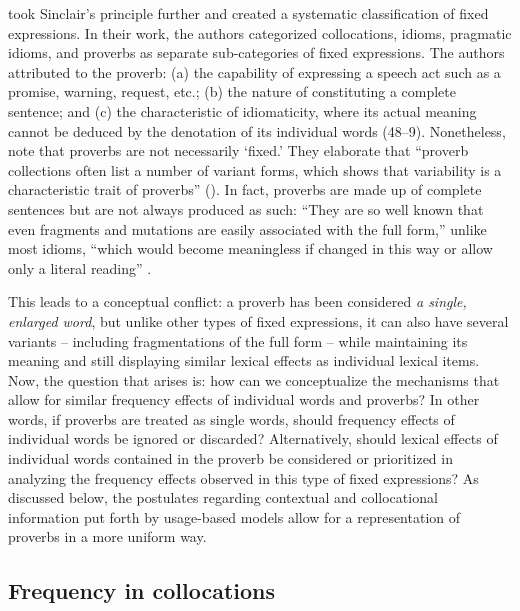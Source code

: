 \documentclass[output=paper,colorlinks,citecolor=brown,draftmode]{langscibook}
\begin{document}
\citet{gramley1992survey} took Sinclair's principle further and created a systematic classification of fixed expressions. In their work, the authors categorized collocations, idioms, pragmatic idioms, and proverbs as separate sub-categories of fixed expressions. The authors attributed to the proverb: (a) the capability of expressing a speech act such as a promise, warning, request, etc.; (b) the nature of constituting a complete sentence; and (c) the characteristic of idiomaticity, where its actual meaning cannot be deduced by the denotation of its individual words (48--9). Nonetheless, \citet{gramley1992survey} note that proverbs are not necessarily `fixed.' They elaborate that ``proverb collections often list a number of variant forms, which shows that variability is a characteristic trait of proverbs'' (\citeyear[60]{gramley1992survey}). In fact, proverbs are made up of complete sentences but are not always produced as such: ``They are so well known that even fragments and mutations are easily associated with the full form,” unlike most idioms, “which would become meaningless if changed in this way or allow only a literal reading” \parencite*[60--61]{gramley1992survey}.

This leads to a conceptual conflict: a proverb has been considered \emph{a single, enlarged word}, but unlike other types of fixed expressions, it can also have several variants -- including fragmentations of the full form -- while maintaining its meaning and still displaying similar lexical effects as individual lexical items. Now, the question that arises is: how can we conceptualize the mechanisms that allow for similar frequency effects of individual words and proverbs? In other words, if proverbs are treated as single words, should frequency effects of individual words be ignored or discarded? Alternatively, should lexical effects of individual words contained in the proverb be considered or prioritized in analyzing the frequency effects observed in this type of fixed expressions? As discussed below, the postulates regarding contextual and collocational information put forth by usage-based models allow for a representation of proverbs in a more uniform way.

\subsection{Frequency in collocations}
\end{document}
